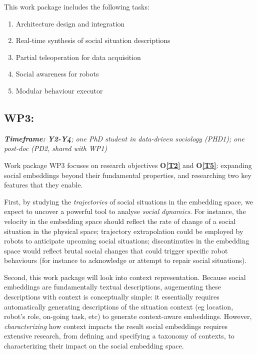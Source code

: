 %
%

This work package includes the following tasks:

\begin{enumerate}[label=\textbf{T2.\arabic*}]
    \item{Architecture design and integration}
    \item{Real-time synthesis of social situation descriptions}
    \item{Partial teleoperation for data acquisition}
    \item{Social awareness for robots}
    \item{Modular behaviour executor}
\end{enumerate}

\subsection{WP3: \textbf{\wpThree}} 

\emph{    \textbf{Timeframe:} \textbf{Y2-Y4}; one PhD student in data-driven sociology
    (PHD1); one post-doc (PD2, shared with WP1)}


Work package WP3 focuses on research objectives {\bf O\ref{T2}} and {\bf
O\ref{T5}}: expanding social embeddings beyond their fundamental properties, and
researching two key features that they enable.

First, by studying the \emph{trajectories} of social situations in the
embedding space, we expect to uncover a powerful tool to analyse \emph{social
dynamics}. For instance, the velocity in the embedding space should reflect the
rate of change of a social situation in the physical space; trajectory
extrapolation could be employed by robots to anticipate upcoming social
situations; discontinuties in the embedding space would reflect brutal social
changes that could trigger specific robot behaviours (for instance to
acknowledge or attempt to repair social situations).

Second, this work package will look into context representation. Because social
embeddings are fundamentally textual descriptions, augementing these
descriptions with context is conceptually simple: it essentially requires
automatically generating descriptions of the situation context (eg location,
robot's role, on-going task, etc) to generate context-aware embeddings. However,
\emph{characterizing} how context impacts the result social embeddings requires
extensive research, from defining and specifying a taxonomy of contexts, to
characterizing their impact on the social embedding space.

